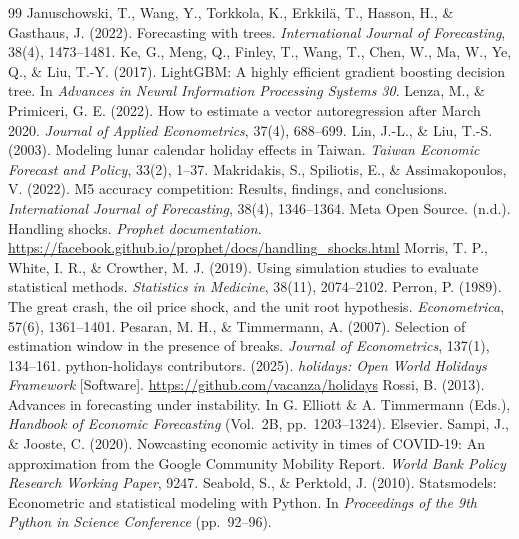 \documentclass{article}
\theoremstyle{plain}
\theoremstyle{definition}
\theoremstyle{remark}
\begin{document}
\begin{thebibliography}{99}
 Januschowski, T., Wang, Y., Torkkola, K., Erkkilä, T., Hasson, H., \& Gasthaus, J. (2022). Forecasting with trees. \emph{International Journal of Forecasting}, 38(4), 1473--1481.
 Ke, G., Meng, Q., Finley, T., Wang, T., Chen, W., Ma, W., Ye, Q., \& Liu, T.-Y. (2017). LightGBM: A highly efficient gradient boosting decision tree. In \emph{Advances in Neural Information Processing Systems 30}.
 Lenza, M., \& Primiceri, G. E. (2022). How to estimate a vector autoregression after March 2020. \emph{Journal of Applied Econometrics}, 37(4), 688--699.
 Lin, J.-L., \& Liu, T.-S. (2003). Modeling lunar calendar holiday effects in Taiwan. \emph{Taiwan Economic Forecast and Policy}, 33(2), 1--37.
 Makridakis, S., Spiliotis, E., \& Assimakopoulos, V. (2022). M5 accuracy competition: Results, findings, and conclusions. \emph{International Journal of Forecasting}, 38(4), 1346--1364.
 Meta Open Source. (n.d.). Handling shocks. \emph{Prophet documentation}. \url{https://facebook.github.io/prophet/docs/handling_shocks.html}
 Morris, T. P., White, I. R., \& Crowther, M. J. (2019). Using simulation studies to evaluate statistical methods. \emph{Statistics in Medicine}, 38(11), 2074--2102.
 Perron, P. (1989). The great crash, the oil price shock, and the unit root hypothesis. \emph{Econometrica}, 57(6), 1361--1401.
 Pesaran, M. H., \& Timmermann, A. (2007). Selection of estimation window in the presence of breaks. \emph{Journal of Econometrics}, 137(1), 134--161.
 python-holidays contributors. (2025). \emph{holidays: Open World Holidays Framework} [Software]. \url{https://github.com/vacanza/holidays}
 Rossi, B. (2013). Advances in forecasting under instability. In G. Elliott \& A. Timmermann (Eds.), \emph{Handbook of Economic Forecasting} (Vol.\ 2B, pp.\ 1203--1324). Elsevier.
 Sampi, J., \& Jooste, C. (2020). Nowcasting economic activity in times of COVID-19: An approximation from the Google Community Mobility Report. \emph{World Bank Policy Research Working Paper}, 9247.
 Seabold, S., \& Perktold, J. (2010). Statsmodels: Econometric and statistical modeling with Python. In \emph{Proceedings of the 9th Python in Science Conference} (pp.\ 92--96).

\end{thebibliography}
\end{document}
